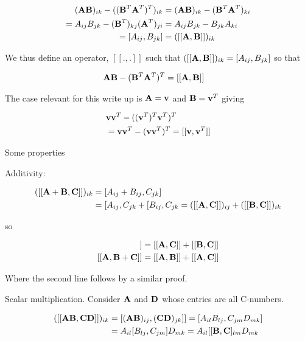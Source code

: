 \documentclass[12pt]{article}
\newcommand{\bv}[1]{\bold{#1}}
\begin{document}
\begin{align}
(\bv{A}\bv{B})_{ik} - ((\bv{B}^T\bv{A}^T)^T)_{ik} &= (\bv{A}\bv{B})_{ik} - (\bv{B}^T\bv{A}^T)_{ki}\\
= A_{ij} B_{jk} - (\bv{B}^T)_{kj}(\bv{A}^T)_{ji} &= A_{ij}B_{jk} - B_{jk} A_{ki}\\
= [A_{ij},B_{jk}] &= ([[\bv{A},\bv{B}]])_{ik} 
\end{align}

We thus define an operator, $[[.,.]]$ such that $([[\bv{A},\bv{B}]])_{ik} = [A_{ij},B_{jk}]$ so that

\begin{align}
&\bv{A}\bv{B} - (\bv{B}^T\bv{A}^T)^T = [[\bv{A},\bv{B}]]
\end{align}

The case relevant for this write up is $\bv{A} = \bv{v}$ and $\bv{B} = \bv{v}^T$ giving

\begin{align}
&\bv{v}\bv{v}^T - ((\bv{v}^T)^T\bv{v}^T)^T\\
&= \bv{v}\bv{v}^T - (\bv{v}\bv{v}^T)^T = [[\bv{v},\bv{v}^T]]
\end{align}

Some properties

Additivity:

\begin{align}
([[\bv{A}+\bv{B},\bv{C}]])_{ik} &= [A_{ij}+B_{ij},C_{jk}]\\
&= [A_{ij},C_{jk}+[B_{ij},C_{jk} = ([[\bv{A},\bv{C}]])_{ij} + ([[\bv{B},\bv{C}]])_{ik}
\end{align}

so

\begin{align}
[[\bv{A}+\bv{B},\bv{C}]] &= [[\bv{A},\bv{C}]]+[[\bv{B},\bv{C}]]\\
[[\bv{A},\bv{B}+\bv{C}]] &= [[\bv{A},\bv{B}]] + [[\bv{A},\bv{C}]]
\end{align}

Where the second line follows by a similar proof.

Scalar multiplication. Consider $\bv{A}$ and $\bv{D}$ whose entries are all C-numbers.

\begin{align}
([[\bv{A}\bv{B},\bv{C}\bv{D}]])_{ik} &= [(\bv{A}\bv{B})_{ij},(\bv{C}\bv{D})_{jk}]] = [A_{il}B_{lj},C_{jm}D_{mk}]\\
&= A_{il}[B_{lj},C_{jm}]D_{mk}= A_{il}[[\bv{B},\bv{C}]_{lm} D_{mk}
\end{align}
\end{document}
